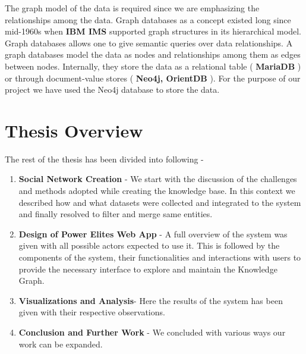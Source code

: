     The graph model of the data is required since we are emphasizing the relationships among the data. Graph databases as a concept existed long since mid-1960s when \textbf{ IBM IMS } \cite{korth} \cite{ims} supported graph structures in its hierarchical model. Graph databases allows one to give semantic queries  over data relationships. A graph databases model the data as nodes and relationships among them as edges between nodes. Internally, they store the data as a relational table (\textbf{ MariaDB }\cite{maria}) or through document-value stores (\textbf{ Neo4j, OrientDB }\cite{neo}\cite{orient}). For the purpose of our project we have used the Neo4j database to store the data. 

\section{Thesis Overview}
The rest of the thesis has been divided into following -
\begin{enumerate}
    \item \textbf{Social Network Creation} -  We start with the discussion of the challenges and methods adopted while  creating the knowledge base. In this context we described how and what datasets were collected and integrated to the system and finally resolved to filter and merge same entities.
    \item \textbf{Design of Power Elites Web App}  -  A full overview of the system was given with all possible actors expected to use it. This is followed by the components  of the system, their functionalities and interactions with users to provide the necessary interface to explore and maintain the Knowledge Graph.

    \item \textbf{Visualizations and Analysis}- Here the results of the system has been given with their respective observations. 
    \item \textbf{Conclusion and Further Work} - We concluded with various ways our work can be expanded.

\end{enumerate}



%
%
